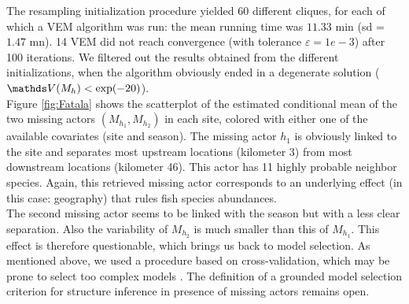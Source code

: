 %
The resampling initialization procedure yielded 60 different cliques, for each of which a VEM algorithm was run: the mean running time was $11.33$ min (sd = $1.47$ mn). 14 VEM did not reach convergence (with tolerance $\varepsilon = 1e-3$) after 100 iterations. We filtered out the results obtained from the different initializations, when the algorithm obviously ended in a degenerate solution ($\Var(M_h) < \exp(-20)$). \\ 
%
Figure \ref{fig:Fatala} shows the scatterplot of the estimated conditional mean of the two missing actors $(M_{h_1}, M_{h_2})$ in each site, colored with either one of the available covariates (site and season). The missing actor $h_1$ is obviously linked to the site and separates most upstream locations (kilometer 3) from most downstream locations (kilometer 46). This actor has 11 highly probable neighbor species.
Again, this retrieved missing actor corresponds to an underlying effect (in this case: geography) that rules fish species abundances. \\
% 
The second missing actor seems to be linked with the season but with a less clear separation. Also the variability of $M_{h_2}$ is much smaller than this of $M_{h_1}$. This effect is therefore questionable, which brings us back to model selection. As mentioned above, we used a procedure based on cross-validation, which may  be prone to select too complex models \citep{shao1993linear,friedman2001elements,arlot2010survey}. The definition of a grounded model selection criterion for structure inference in presence of missing actors remains open.

